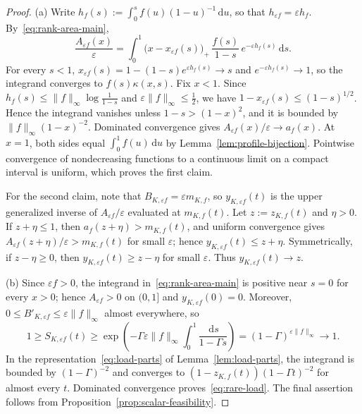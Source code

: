 \documentclass[11pt]{article}
\theoremstyle{definition}
\theoremstyle{remark}
\newcommand{\dd}{\,\mathrm d}
\begin{document}
\begin{proof}
(a)
Write $h_f(s):=\int_0^sf(u)(1-u)^{-1}\dd u$, so that $h_{\varepsilon f}=\varepsilon h_f$.
By~\eqref{eq:rank-area-main},
\[
 \frac{A_{\varepsilon f}(x)}{\varepsilon}
 =\int_0^1\bigl(x-x_{\varepsilon f}(s)\bigr)_+\,\frac{f(s)}{1-s}\,e^{-\varepsilon h_f(s)}\dd s.
\]
For every $s<1$, $x_{\varepsilon f}(s)=1-(1-s)e^{\varepsilon h_f(s)}\to s$ and $e^{-\varepsilon h_f(s)}\to1$, so the integrand converges to $f(s)\kappa(x,s)$.
Fix $x<1$.
Since $h_f(s)\le\|f\|_\infty\log\frac1{1-s}$ and $\varepsilon\|f\|_\infty\le\frac12$, we have $1-x_{\varepsilon f}(s)\le(1-s)^{1/2}$.
Hence the integrand vanishes unless $1-s>(1-x)^2$, and it is bounded by $\|f\|_\infty(1-x)^{-2}$.
Dominated convergence gives $A_{\varepsilon f}(x)/\varepsilon\to a_f(x)$.
At $x=1$, both sides equal $\int_0^1 f(u)\dd u$ by Lemma~\ref{lem:profile-bijection}.
Pointwise convergence of nondecreasing functions to a continuous limit on a compact interval is uniform, which proves the first claim.

For the second claim, note that $B_{K,\varepsilon f}=\varepsilon m_{K,f}$, so $y_{K,\varepsilon f}(t)$ is the upper generalized inverse of $A_{\varepsilon f}/\varepsilon$ evaluated at $m_{K,f}(t)$.
Let $z:=z_{K,f}(t)$ and $\eta>0$.
If $z+\eta\le1$, then $a_f(z+\eta)>m_{K,f}(t)$, and uniform convergence gives $A_{\varepsilon f}(z+\eta)/\varepsilon>m_{K,f}(t)$ for small $\varepsilon$; hence $y_{K,\varepsilon f}(t)\le z+\eta$.
Symmetrically, if $z-\eta\ge0$, then $y_{K,\varepsilon f}(t)\ge z-\eta$ for small $\varepsilon$.
Thus $y_{K,\varepsilon f}(t)\to z$.

(b)
Since $\varepsilon f>0$, the integrand in~\eqref{eq:rank-area-main} is positive near $s=0$ for every $x>0$; hence $A_{\varepsilon f}>0$ on $(0,1]$ and $y_{K,\varepsilon f}(0)=0$.
Moreover, $0\le B'_{K,\varepsilon f}\le\varepsilon\|f\|_\infty$ almost everywhere, so
\[
 1\ge S_{K,\varepsilon f}(t)
 \ge\exp\!\left(-\Gamma\varepsilon\|f\|_\infty\int_0^1\frac{\dd s}{1-\Gamma s}\right)
 =(1-\Gamma)^{\varepsilon\|f\|_\infty}
 \longrightarrow1.
\]
In the representation~\eqref{eq:load-parts} of Lemma~\ref{lem:load-parts}, the integrand is bounded by $(1-\Gamma)^{-2}$ and converges to $(1-z_{K,f}(t))(1-\Gamma t)^{-2}$ for almost every $t$.
Dominated convergence proves~\eqref{eq:rare-load}.
The final assertion follows from Proposition~\ref{prop:scalar-feasibility}.
\end{proof}
\end{document}
